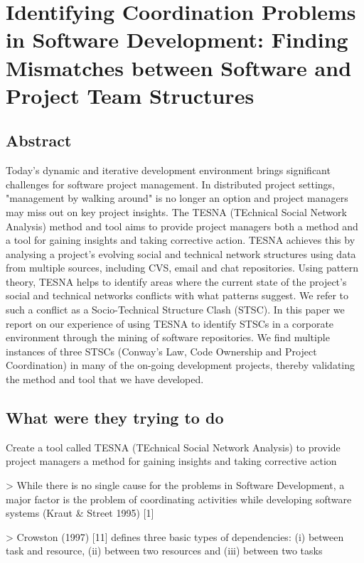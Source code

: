 \section{Identifying Coordination Problems in Software Development: Finding Mismatches between Software and Project Team Structures}

\subsection{Abstract}

Today's dynamic and iterative development environment brings significant challenges for software project management. In distributed project settings, "management by walking around" is no longer an option and project managers may miss out on key project insights. The TESNA (TEchnical Social Network Analysis) method and tool aims to provide project managers both a method and a tool for gaining insights and taking corrective action. TESNA achieves this by analysing a project's evolving social and technical network structures using data from multiple sources, including CVS, email and chat repositories. Using pattern theory, TESNA helps to identify areas where the current state of the project's social and technical networks conflicts with what patterns suggest. We refer to such a conflict as a Socio-Technical Structure Clash (STSC). In this paper we report on our experience of using TESNA to identify STSCs in a corporate environment through the mining of software repositories. We find multiple instances of three STSCs (Conway's Law, Code Ownership and Project Coordination) in many of the on-going development projects, thereby validating the method and tool that we have developed.

\subsection{What were they trying to do}

Create a tool called TESNA (TEchnical Social Network Analysis) to provide project managers a method for gaining insights and taking corrective action

> While there is no single cause for the problems in Software Development, a major factor is the problem of coordinating activities while developing software systems (Kraut \& Street 1995) [1] \cite{krautCoordinationSoftwareDevelopment1995}

> Crowston (1997) [11] \cite{crowstonCoordinationTheoryApproach1997} defines three basic types of dependencies: (i) between task and resource, (ii) between two resources and (iii) between two tasks

